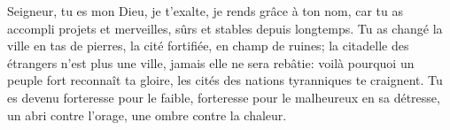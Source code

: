 Seigneur, tu es mon Dieu, je t’exalte,
	je rends grâce à ton nom,
	car tu as accompli projets et merveilles,
	sûrs et stables depuis longtemps.
Tu as changé la ville en tas de pierres,
	la cité fortifiée, en champ de ruines;
	la citadelle des étrangers n’est plus une ville,
	jamais elle ne sera rebâtie:
	voilà pourquoi un peuple fort reconnaît ta gloire,
	les cités des nations tyranniques te craignent.
Tu es devenu forteresse pour le faible,
	forteresse pour le malheureux en sa détresse,
	un abri contre l’orage, une ombre contre la chaleur.
